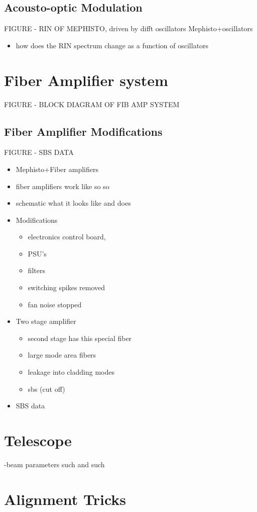 \documentclass[twocolumn,aps,pra,showpacs,preprintnumbers,bibnotes]{revtex4-1}
\begin{document}
\subsection{Acousto-optic Modulation}

FIGURE - RIN OF MEPHISTO, driven by difft oscillators
Mephisto+oscillators
\begin{itemize}
	\item how does the RIN spectrum change as a function of oscillators
\end{itemize}
\section{Fiber Amplifier system}
FIGURE - BLOCK DIAGRAM OF FIB AMP SYSTEM

\subsection{Fiber Amplifier Modifications}
FIGURE - SBS DATA
\begin{itemize}
	\item Mephisto+Fiber amplifiers
\item fiber amplifiers work like so so
\item schematic what it looks like and does
\item Modifications
	\begin{itemize}
		\item electronics control board,
		\item PSU's
		\item filters
		\item switching spikes removed
		\item fan noise stopped
	\end{itemize}
\item Two stage amplifier
	\begin{itemize}
		\item second stage has this special fiber 
		\item large mode area fibers
		\item leakage into cladding modes 
		\item sbs (cut off)
	\end{itemize}
\item SBS data
\end{itemize}
\section{Telescope}
-beam parameters such and such

\section{Alignment Tricks}
\end{document}
